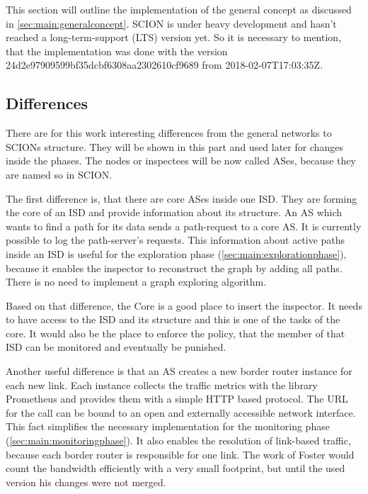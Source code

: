 \documentclass[thesis.tex]{subfiles}
\begin{document}
This section will outline the implementation of the general concept as discussed in \autoref{sec:main:generalconcept}. SCION is under heavy development and hasn't reached a long-term-support (LTS) version yet. So it is necessary to mention, that the implementation was done with the version  {\scriptsize 24d2e97909599bf35dcbf6308aa2302610cf9689} from {\scriptsize 2018-02-07T17:03:35Z}. 

\subsection{Differences}

There are for this work interesting differences from the general networks to SCIONs structure. They will be shown in this part and used later for changes inside the phases. The nodes or inspectees will be now called ASes, because they are named so in SCION.

The first difference is, that there are core ASes inside one ISD. They are forming the core of an ISD and provide information about its structure. An AS which wants to find a path for its data sends a path-request to a core AS. It is currently possible to log the path-server's requests. This information about active paths inside an ISD is useful for the exploration phase (\autoref{sec:main:explorationphase}), because it enables the inspector to reconstruct the graph by adding all paths. There is no need to implement a graph exploring algorithm.

Based on that difference, the Core is a good place to insert the inspector. It needs to have access to the ISD and its structure and this is one of the tasks of the core. It would also be the place to enforce the policy, that the member of that ISD can be monitored and eventually be punished. 

Another useful difference is that an AS creates a new border router instance for each new link. Each instance collects the traffic metrics with the library Prometheus and provides them with a simple HTTP based protocol. The URL for the call can be bound to an open and externally accessible network interface. This fact simplifies the necessary implementation for the monitoring phase (\autoref{sec:main:monitoringphase}). It also enables the resolution of link-based traffic, because each border router is responsible for one link. The work of Foster\cite{Forster.September2017} would count the bandwidth efficiently with a very small footprint, but until the used version his changes were not merged. 
\end{document}
